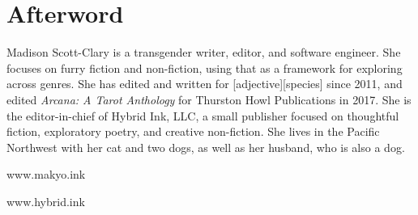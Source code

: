 \chapter{Afterword}

\noindent Madison Scott-Clary is a transgender writer, editor, and software engineer. She focuses on furry fiction and non-fiction, using that as a framework for exploring across genres. She has edited and written for [adjective][species] since 2011, and edited \emph{Arcana: A Tarot Anthology} for Thurston Howl Publications in 2017. She is the editor-in-chief of Hybrid Ink, LLC, a small publisher focused on thoughtful fiction, exploratory poetry, and creative non-fiction. She lives in the Pacific Northwest with her cat and two dogs, as well as her husband, who is also a dog.

\begin{center}
    www.makyo.ink

    www.hybrid.ink
\end{center}
